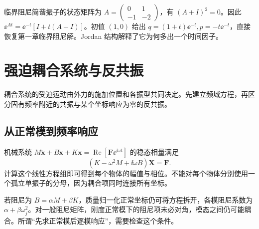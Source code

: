 \documentclass[11pt,openany,fontset=fandol]{ctexbook}
\theoremstyle{plain}\newtheorem{theorem}{定理}[chapter]\newtheorem{proposition}[theorem]{命题}
\theoremstyle{definition}\newtheorem{definition}{定义}[chapter]\newtheorem{example}{例}[chapter]
\theoremstyle{remark}\newtheorem*{remark}{说明}
\newcommand{\vct}[1]{\bm{#1}}\newcommand{\Rea}{\operatorname{Re}}\newcommand{\Ima}{\operatorname{Im}}
\begin{document}
临界阻尼简谐振子的状态矩阵为 $A=\begin{pmatrix}0&1\\-1&-2\end{pmatrix}$，有 $(A+I)^2=0$。因此 $\ee^{At}=\ee^{-t}[I+t(A+I)]$。初值 $(1,0)$ 给出 $q=(1+t)\ee^{-t},p=-t\ee^{-t}$，直接恢复第一章临界阻尼解。Jordan 结构解释了它为何多出一个时间因子。

\section{强迫耦合系统与反共振}
耦合系统的受迫运动由外力的施加位置和各振型共同决定。先建立频域方程，再区分固有频率附近的共振与某个坐标响应为零的反共振。

\subsection{从正常模到频率响应}
机械系统 $M\ddot{\vct x}+B\dot{\vct x}+K\vct x=\Rea[\vct F\ee^{\ii\omega t}]$ 的稳态相量满足
\[
(K-\omega^2M+\ii\omega B)\vct X=\vct F.
\]
计算这个线性方程组即可得到每个物体的幅值与相位。不能对每个物体分别使用一个孤立单振子的分母，因为耦合项同时连接所有坐标。

若阻尼为 $B=\alpha M+\beta K$，质量归一化正常坐标仍可将方程拆开，各模阻尼系数为 $\alpha+\beta\omega_j^2$。对一般阻尼矩阵，刚度正常模下的阻尼项未必对角，模态之间仍可能耦合。所谓“先求正常模后逐模响应”，需要检查这个条件。
\end{document}
